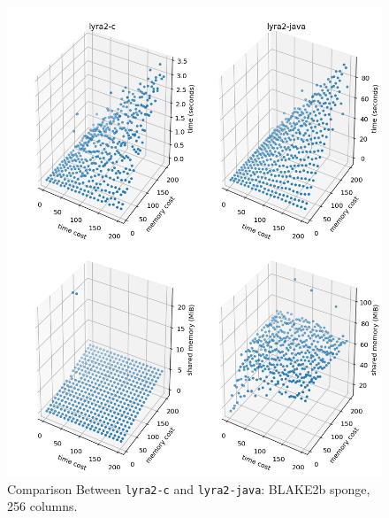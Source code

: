 \begin{figure}[p]
    \centering
    \includegraphics[width=\linewidth,keepaspectratio]{figures/tcost_mcost_blake2b_256}
    \caption{Comparison Between \texttt{lyra2-c} and \texttt{lyra2-java}: BLAKE2b sponge, 256 columns.}
    \label{figure:tcost_mcost_blake2b_256}
\end{figure}

